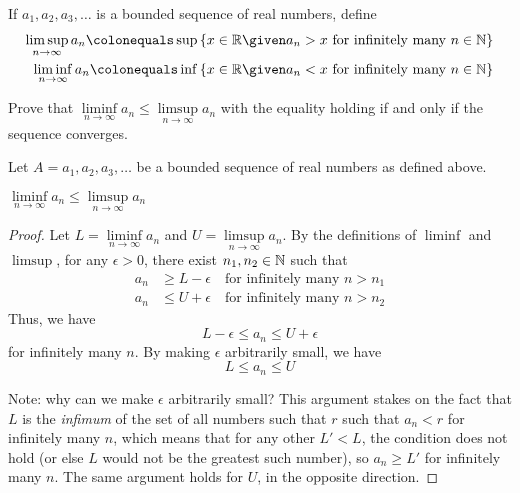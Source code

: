 \begin{problem}
  If $a_1, a_2, a_3, \ldots$ is a bounded sequence of real numbers, define
  \begin{align*}
    \limsup\limits_{n \to \infty}{a_n}
    \colonequals
    \sup \set{x \in \R \given a_n > x \text{ for infinitely many } n \in \N}
    \\
    \liminf\limits_{n \to \infty}{a_n}
    \colonequals
    \inf \set{x \in \R \given a_n < x \text{ for infinitely many } n \in \N}
  \end{align*}

  Prove that $\liminf\limits_{n \to \infty}{a_n} \leq \limsup\limits_{n \to \infty}{a_n}$
  with the equality holding if and only if the sequence converges.
\end{problem}

\begin{answer}
  Let $A = a_1, a_2, a_3, \ldots$ be a bounded sequence of real numbers as defined above.

  \begin{claim}
    $\liminf\limits_{n \to \infty}{a_n} \leq \limsup\limits_{n \to \infty}{a_n}$
    \begin{proof}
      Let $L = \liminf\limits_{n \to \infty}{a_n}$ and $U = \limsup\limits_{n \to \infty}{a_n}$.
      By the definitions of $\liminf$ and $\limsup$, for any $\epsilon > 0$, there exist
      $n_1, n_2 \in \mathbb{N}$ such that
      \begin{align*}
        a_n &\ge L - \epsilon \quad \text{for infinitely many } n > n_1 \\
        a_n &\le U + \epsilon \quad \text{for infinitely many } n > n_2
      \end{align*}
      Thus, we have
      \[ L - \epsilon \le a_n \le U + \epsilon \]
      for infinitely many $n$.
      By making $\epsilon$ arbitrarily small, we have
      \[ L \le a_n \le U \]

      \step
      Note: why can we make $\epsilon$ arbitrarily small?
      This argument stakes on the fact that $L$ is the \emph{infimum} of the set of all
      numbers such that $r$ such that $a_n < r$ for infinitely many $n$,
      which means that for any other $L' < L$,
      the condition does not hold (or else $L$ would not be the greatest such number),
      so $a_n \ge L'$ for infinitely many $n$.
      The same argument holds for $U$, in the opposite direction.
    \end{proof}
  \end{claim}


\end{answer}
